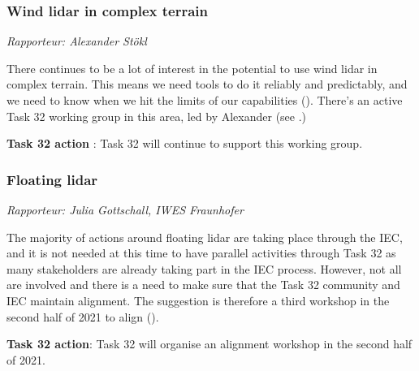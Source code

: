 \subsubsection{Wind lidar in complex terrain}

\emph{Rapporteur: Alexander St\"okl}

There continues to be a lot of interest in the potential to use wind lidar in complex terrain. This means we need tools to do it reliably and predictably, and we need to know when we hit the limits of our capabilities (). There's an active Task 32 working group in this area, led by Alexander (see .)


\begin{taskactions}
\textbf{Task 32 action} : Task 32 will continue to support this working
group.
\end{taskactions}

\subsubsection{Floating lidar}

\emph{Rapporteur: Julia Gottschall, IWES Fraunhofer}

The majority of actions around floating lidar are taking place through the IEC, and it is not needed at this time to have parallel activities through Task 32 as many stakeholders are already taking part in the IEC process. However, not all are involved and there is a need to make sure that the Task 32 community and IEC maintain alignment. The suggestion is therefore a third workshop in the second half of 2021 to align ().


\begin{taskactions}
\textbf{Task 32 action}: Task 32 will organise an alignment workshop in
the second half of 2021.
\end{taskactions}

